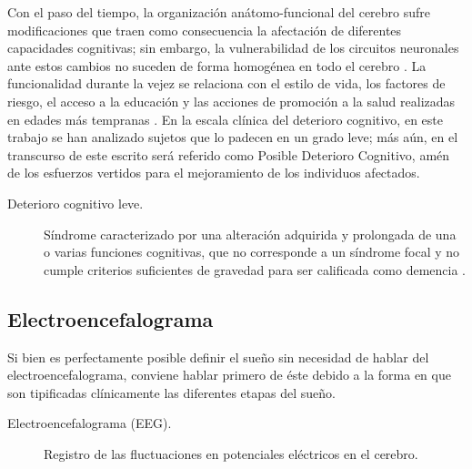 \documentclass[12pt,a4paper]{mitthesis}
\begin{document}
Con el paso del tiempo, la organizaci\'on an\'atomo-funcional del cerebro sufre modificaciones que 
traen como consecuencia la afectaci\'on de diferentes capacidades cognitivas; sin embargo, la 
vulnerabilidad de los circuitos neuronales ante estos cambios no suceden de forma homog\'enea en 
todo el cerebro \cite{Hita14}.
La funcionalidad durante la vejez se relaciona con el estilo de vida, los factores de riesgo, el 
acceso a la educaci\'on y las acciones de promoci\'on a la salud realizadas en edades m\'as 
tempranas \cite{Ohayon04,Sanhueza14}.
En la escala cl\'inica del deterioro cognitivo, en este trabajo se han analizado sujetos que lo
padecen en un grado leve; m\'as a\'un, en el transcurso de este escrito ser\'a referido como 
Posible Deterioro Cognitivo, am\'en de los esfuerzos vertidos para el mejoramiento de los 
individuos afectados.

\begin{description}
\item[Deterioro cognitivo leve.] S\'indrome caracterizado por una alteraci\'on adquirida y 
prolongada de una o varias funciones cognitivas, que no corresponde a un s\'indrome focal y no 
cumple criterios suficientes de gravedad para ser calificada como demencia \cite{Robles02}.
\end{description}



\subsection{Electroencefalograma}

Si bien es perfectamente posible definir el sue\~no sin necesidad de hablar del 
electroencefalograma, conviene hablar primero de \'este debido a la forma en que son tipificadas
cl\'inicamente las diferentes etapas del sue\~no.

\begin{description}
\item[Electroencefalograma (EEG).] Registro de las fluctuaciones en potenciales el\'ectricos en el 
cerebro.
\end{description}
\end{document}

